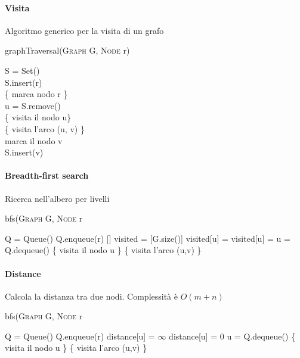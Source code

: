 \documentclass[../../notes.tex]{subfiles}
\begin{document}
  \paragraph{Visita} Algoritmo generico per la visita di un grafo

  \begin{algorithm}[H]
    \NoCaptionOfAlgo
    \caption{graphTraversal(\textsc{Graph} G, \textsc{Node} r)}

     S = Set()\\
    S.insert(r)\\
    \{ marca nodo r \}\\
     {
       u = S.remove()\\
      \{ visita il nodo u\}\\
       {
        \{ visita l'arco (u, v) \}\\
         {
          {marca il nodo v}\\
          S.insert(v)\\
        }
      }
    }

  \end{algorithm}

  \paragraph{Breadth-first search} Ricerca nell'albero per livelli

  \begin{algorithm}[H]
    \NoCaptionOfAlgo
    \caption{bfs(\textsc{Graph} G, \textsc{Node} r}

     Q = Queue()
    Q.enqueue(r)
    [] visited = [G.size()]
     {
      visited[u] = 
    }
    visited[u] = 
     {
       u = Q.dequeue()
      \{ visita il nodo u \}
       {
        \{ visita l'arco (u,v) \}
      }
    }
  \end{algorithm}

  \paragraph{Distance} Calcola la distanza tra due nodi. Complessità è $O(m+n)$

  \begin{algorithm}[H]
    \NoCaptionOfAlgo
    \caption{bfs(\textsc{Graph} G, \textsc{Node} r}

     Q = Queue()
    Q.enqueue(r)
     {
      distance[u] = $\infty$
    }
    distance[u] = 0
     {
       u = Q.dequeue()
      \{ visita il nodo u \}
       {
        \{ visita l'arco (u,v) \}
      }
    }
  \end{algorithm}
\end{document}
